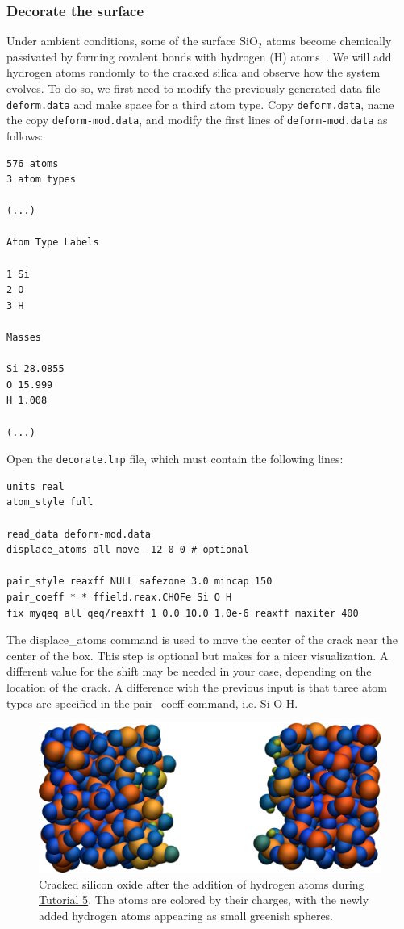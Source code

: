 \documentclass[9pt,tutorial]{livecoms}
\newcommand{\lmpcmd}[1]{\colorbox{listing}{\textcolor{command}{\small{#1}}}} %
\newcommand{\flecmd}[1]{\textcolor{command}{\texttt{#1}}} %
\begin{document}
\subsubsection{Decorate the surface}

Under ambient conditions, some of the surface $\text{SiO}_2$ atoms become chemically
passivated by forming covalent bonds with hydrogen (H) atoms~\cite{sulpizi2012silica}.
We will add hydrogen atoms randomly to the cracked silica and observe how the
system evolves.  To do so, we first need to modify the previously generated data
file \flecmd{deform.data} and make space for a third atom type.
Copy \flecmd{deform.data}, name the copy \flecmd{deform-mod.data}, and modify the
first lines of \flecmd{deform-mod.data} as follows:
\begin{lstlisting}
576 atoms
3 atom types

(...)

Atom Type Labels

1 Si
2 O
3 H

Masses

Si 28.0855
O 15.999
H 1.008

(...)
\end{lstlisting}

Open the \flecmd{decorate.lmp} file, which must contain the following lines:
\begin{lstlisting}
units real
atom_style full

read_data deform-mod.data
displace_atoms all move -12 0 0 # optional

pair_style reaxff NULL safezone 3.0 mincap 150
pair_coeff * * ffield.reax.CHOFe Si O H
fix myqeq all qeq/reaxff 1 0.0 10.0 1.0e-6 reaxff maxiter 400
\end{lstlisting}
The \lmpcmd{displace\_atoms} command is used to move the center of the
crack near the center of the box.  This step is optional but makes for a nicer
visualization.  A different value for the shift may be needed in
your case, depending on the location of the crack.  A difference with the previous
input is that three atom types are specified in the \lmpcmd{pair\_coeff} command, i.e.
\lmpcmd{Si O H}.

\begin{figure}
\includegraphics[width=\linewidth]{SIO-decorated}
\caption{Cracked silicon oxide after the addition of hydrogen atoms
during \hyperref[reactive-silicon-dioxide-label]{Tutorial 5}.  The atoms
are colored by their charges, with the newly added hydrogen atoms appearing as small
greenish spheres.}
\label{fig:SIO-decorated}
\end{figure}
\end{document}
